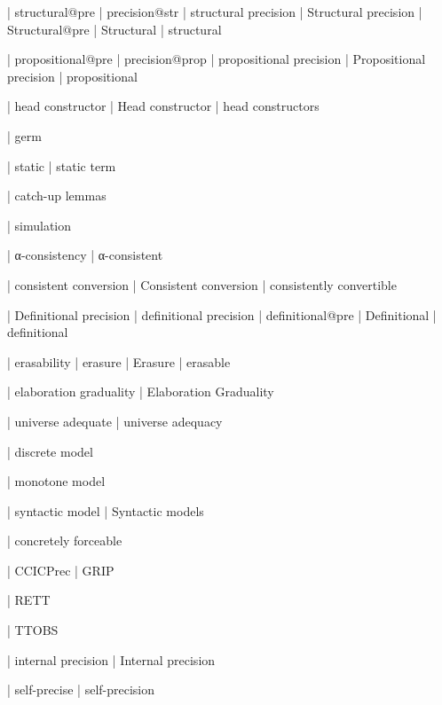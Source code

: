   | structural@pre
  | precision@str
  | structural precision
  | Structural precision
  | Structural@pre
  | Structural
  | structural

  | propositional@pre
  | precision@prop
  | propositional precision
  | Propositional precision
  | propositional


 | head constructor
 | Head constructor
 | head constructors

  | germ

  | static
  | static term

  | catch-up lemmas

  | simulation

  | α-consistency
  | α-consistent

  | consistent conversion
  | Consistent conversion
  | consistently convertible

  | Definitional precision
  | definitional precision
  | definitional@pre
  | Definitional
  | definitional

  | erasability
  | erasure
  | Erasure
  | erasable

  | elaboration graduality
  | Elaboration Graduality

  | universe adequate
  | universe adequacy


  | discrete model

  | monotone model

  | syntactic model
  | Syntactic models

  | concretely forceable

  | CCICPrec
  | GRIP

  | RETT

  | TTOBS

  | internal precision
  | Internal precision

  | self-precise
  | self-precision

